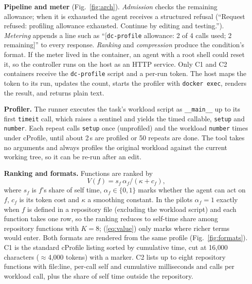 \documentclass[conference]{IEEEtran}
\newcommand{\tool}{\texttt{dc-profile}}
\begin{document}
\textbf{Pipeline and meter} (Fig.~\ref{fig:arch}). \emph{Admission} checks the
remaining allowance; when it is exhausted the agent receives a structured
refusal (``Request refused: profiling allowance exhausted. Continue by editing
and testing.''). \emph{Metering} appends a line such as ``[\tool{} allowance: 2
of 4 calls used; 2 remaining]'' to every response. \emph{Ranking} and
\emph{compression} produce the condition's format. If the meter lived in the
container, an agent with a root shell could reset it, so the controller runs
on the host as an HTTP service. Only C1 and C2 containers receive the
\tool{} script and a per-run token. The host maps the token to its run, updates
the count, starts the profiler with \texttt{docker exec}, renders the result,
and returns plain text.

\textbf{Profiler.} The runner executes the task's workload script as
\texttt{\_\_main\_\_} up to its first \texttt{timeit} call, which raises a
sentinel and yields the timed callable, \texttt{setup} and \texttt{number}. Each
repeat calls \texttt{setup} once (unprofiled) and the workload \texttt{number}
times under cProfile, until about 2\,s are profiled or 50 repeats are done. The
tool takes no arguments and always profiles the original workload against the
current working tree, so it can be re-run after an edit.

\textbf{Ranking and formats.} Functions are ranked by
\begin{equation}
V(f) = s_f\,\alpha_f/(\kappa + c_f),
\label{eq:value}
\end{equation}
where $s_f$ is $f$'s share of self time, $\alpha_f\in\{0,1\}$ marks whether the
agent can act on $f$, $c_f$ is its token cost and $\kappa$ a smoothing
constant. In the pilots $\alpha_f=1$ exactly when $f$ is defined in a
repository file (excluding the workload script) and each function takes one
row, so the ranking reduces to self-time share among repository functions with
$K=8$; (\ref{eq:value}) only marks where richer terms would enter. Both formats
are rendered from the same profile (Fig.~\ref{fig:formats}). C1 is the standard
cProfile listing sorted by cumulative time, cut at 16{,}000 characters
($\approx$4{,}000 tokens) with a marker. C2 lists up to eight repository
functions with file:line, per-call self and cumulative milliseconds and calls
per workload call, plus the share of self time outside the repository.
\end{document}
